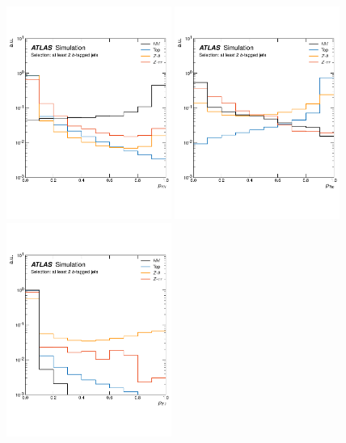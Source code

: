 \begin{figure}[!htb]
    \begin{center}
        \includegraphics[width=0.48\textwidth]{figures/search_hh/nn_disc/pi_plot_NN_p_hh}
        \includegraphics[width=0.48\textwidth]{figures/search_hh/nn_disc/pi_plot_NN_p_top}
        \includegraphics[width=0.48\textwidth]{figures/search_hh/nn_disc/pi_plot_NN_p_zsf}

\end{center}
\end{figure}
